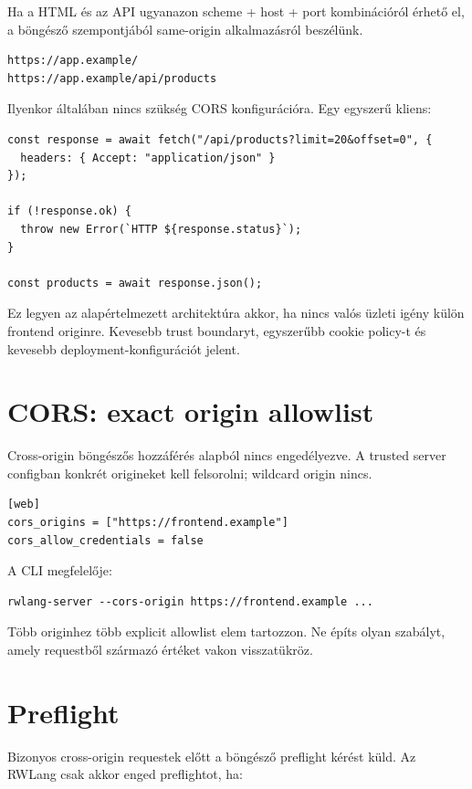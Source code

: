 Ha a HTML és az API ugyanazon scheme + host + port kombinációról érhető el, a böngésző szempontjából same-origin alkalmazásról beszélünk.

\begin{lstlisting}
https://app.example/
https://app.example/api/products
\end{lstlisting}

Ilyenkor általában nincs szükség CORS konfigurációra. Egy egyszerű kliens:

\begin{lstlisting}
const response = await fetch("/api/products?limit=20&offset=0", {
  headers: { Accept: "application/json" }
});

if (!response.ok) {
  throw new Error(`HTTP ${response.status}`);
}

const products = await response.json();
\end{lstlisting}

Ez legyen az alapértelmezett architektúra akkor, ha nincs valós üzleti igény külön frontend originre. Kevesebb trust boundaryt, egyszerűbb cookie policy-t és kevesebb deployment-konfigurációt jelent.

\section{CORS: exact origin allowlist}

Cross-origin böngészős hozzáférés alapból nincs engedélyezve. A trusted server configban konkrét origineket kell felsorolni; wildcard origin nincs.

\begin{lstlisting}
[web]
cors_origins = ["https://frontend.example"]
cors_allow_credentials = false
\end{lstlisting}

A CLI megfelelője:

\begin{lstlisting}
rwlang-server --cors-origin https://frontend.example ...
\end{lstlisting}

Több originhez több explicit allowlist elem tartozzon. Ne építs olyan szabályt, amely requestből származó  értéket vakon visszatükröz.

\section{Preflight}

Bizonyos cross-origin requestek előtt a böngésző  preflight kérést küld. Az RWLang csak akkor enged preflightot, ha:

